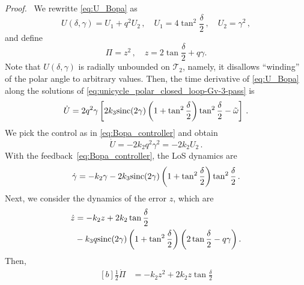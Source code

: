 \documentclass[journal,twoside,web]{ieeecolor}
\theoremstyle{definition}
\renewenvironment{proof}[1][Proof]{\par\pushQED{\qed}\normalfont\textit{#1.}~}{\popQED\par}
\begin{document}
\begin{proof}
We rewritte \eqref{eq:U_Bopa} as
\begin{equation}
    U(\delta,\gamma) =  U_1 + q^2 U_2 \,, \quad U_1 = 4\tan^2\frac{\delta}{2}\,, \quad U_2 = \gamma^2\,, \label{eq:U_BoPa_proof}
\end{equation}
and define
\begin{equation}
     \Pi = z^2\,,  \quad z = 2\tan\frac{\delta}{2} +  q \gamma.
\end{equation}
Note that $U(\delta,\gamma)$ is radially unbounded on $\mathcal{T}_2$, namely, it disallows ``winding'' of the polar angle to arbitrary values. 
Then, the time derivative of \eqref{eq:U_Bopa} along the solutions of \eqref{eq:unicycle_polar_closed_loop-Gv-3-pass} is
\begin{equation}
\dot U  =  2 q^2 \gamma \left[ 2k_3 {\rm sinc}(2\gamma)\left(1 + \tan^2 \frac{\delta}{2}\right)\tan^2\frac{\delta}{2}-\tilde{\omega}
\right]\,. 
\end{equation}
We pick the control as in \eqref{eq:Bopa_controller} and obtain
\begin{equation}
\dot U  =    - 2 k_2 q^2 \gamma^2 = -2k_2 U_2 \,. \label{eq:U_dot_bopa}
\end{equation}
With the feedback~\eqref{eq:Bopa_controller}, the LoS dynamics are 
\begin{equation}
\dot\gamma = - k_2 \gamma -  2k_3 {\rm sinc}(2\gamma)\left(1 + \tan^2 \frac{\delta}{2}\right)\tan^2\frac{\delta}{2} \,.
\end{equation}
Next, we consider the dynamics of the error $z$, which are 
\begin{equation}
\begin{aligned}[b]
\dot z &= -k_2 z + 2 k_2 \tan \frac{\delta}{2}\\
&- k_3 q {\rm sinc}(2\gamma)\left(1+\tan^2\frac{\delta}{2 }\right)  \left( 2 \tan \frac{\delta}{2 } - q \gamma \right).
\end{aligned}
\end{equation}
Then,
\begin{equation}
\begin{aligned}[b]
\frac{1}{2}\dot \Pi &= - k_2z^2 +  2 k_2 z \tan \frac{\delta}{2} \\

\end{aligned}
\end{equation}
\end{proof}
\end{document}
